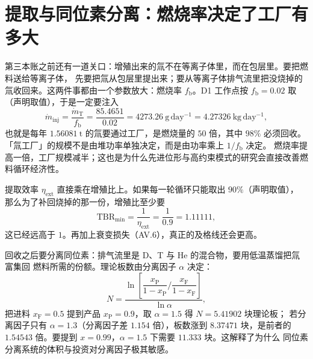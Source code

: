 \section{提取与同位素分离：燃烧率决定了工厂有多大}
\label{sec:app-av-extract}

第三本账之前还有一道关口：增殖出来的氚不在等离子体里，而在包层里。要把燃料送给等离子体，
先要把氚从包层里提出来；要从等离子体排气流里把没烧掉的氚收回来。这两件事都由一个参数放大：燃烧率 $f_\mathrm{b}$。D1 工作点按 $f_\mathrm{b}=0.02$ 取（声明取值），于是一定要注入
\begin{equation}
\dot m_\mathrm{inj}=\frac{\dot m_\mathrm{T}}{f_\mathrm{b}}
=\frac{85.4651}{0.02}
=4273.26\ \mathrm{g\,day^{-1}}=4.27326\ \mathrm{kg\,day^{-1}},
\label{eq:app-av-inject}
\end{equation}
也就是每年 $1.56081\ \mathrm{t}$ 的氚要通过工厂，是燃烧量的 $50$ 倍，其中 $98\%$ 必须回收。
「氚工厂」的规模不是由堆功率单独决定，而是由功率乘上 $1/f_\mathrm{b}$ 决定。
燃烧率提高一倍，工厂规模减半；这也是为什么先进位形与高约束模式的研究会直接改善燃料循环经济性。

提取效率 $\eta_\mathrm{ext}$ 直接乘在增殖比上。如果每一轮循环只能取出 $90\%$（声明取值），
那么为了补回烧掉的那一份，增殖比至少要
\begin{equation}
\mathrm{TBR}_\mathrm{min}=\frac{1}{\eta_\mathrm{ext}}=\frac{1}{0.9}=1.11111,
\label{eq:app-av-tbrmin}
\end{equation}
这已经远高于 $1$。再加上衰变损失（AV.6），真正的及格线还会更高。

回收之后要分离同位素：排气流里是 D、T 与 He 的混合物，要用低温蒸馏把氚富集回
燃料所需的份额。理论板数由分离因子 $\alpha$ 决定：
\begin{equation}
N=\frac{\ln\left[\dfrac{x_\mathrm{P}}{1-x_\mathrm{P}}\Big/\dfrac{x_\mathrm{F}}{1-x_\mathrm{F}}\right]}{\ln\alpha},
\label{eq:app-av-stage}
\end{equation}
把进料 $x_\mathrm{F}=0.5$ 提到产品 $x_\mathrm{P}=0.9$，取 $\alpha=1.5$ 得 $N=5.41902$ 块理论板；
若分离因子只有 $\alpha=1.3$（分离因子差 $1.154$ 倍），板数涨到 $8.37471$ 块，是前者的
$1.54543$ 倍。要提到 $x=0.99$，$\alpha=1.5$ 下需要 $11.333$ 块。这解释了为什么
同位素分离系统的体积与投资对分离因子极其敏感。

